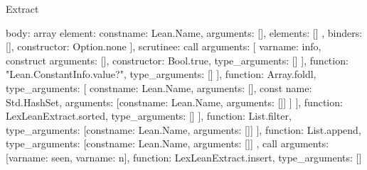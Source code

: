 \begin{lexlean}{Extract}
\begin{toolingmodule}
{{{{{{{{{{{{{{                                              body: array{
                                                element: const{name: Lean.Name, arguments: []},
                                                elements: []
                                              },
                                              binders: [],
                                              constructor: Option.none
                                            }
                                          ],
                                          scrutinee: call{
                                            arguments: [
                                              var{name: info},
                                              construct{
                                                arguments: [],
                                                constructor: Bool.true,
                                                type_arguments: []
                                              }
                                            ],
                                            function: "Lean.ConstantInfo.value?",
                                            type_arguments: []
                                          }
                                        }
                                      ],
                                      function: Array.foldl,
                                      type_arguments: [
                                        const{name: Lean.Name, arguments: []},
                                        const{
                                          name: Std.HashSet,
                                          arguments: [const{name: Lean.Name, arguments: []}]
                                        }
                                      ]
                                    }
                                  ],
                                  function: LexLeanExtract.sorted,
                                  type_arguments: []
                                }
                              ],
                              function: List.filter,
                              type_arguments: [const{name: Lean.Name, arguments: []}]
                            }
                          ],
                          function: List.append,
                          type_arguments: [const{name: Lean.Name, arguments: []}]
                        },
                        call{
                          arguments: [var{name: seen}, var{name: n}],
                          function: LexLeanExtract.insert,
                          type_arguments: []
                        }
}}}}}}}}
\end{toolingmodule}
\end{lexlean}
